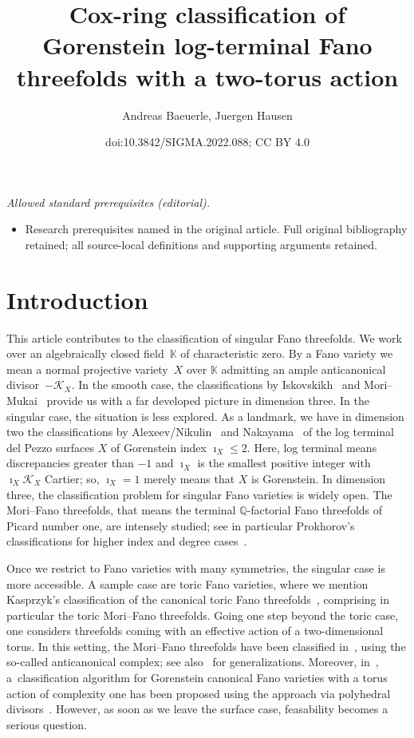 \documentclass[10pt,a4paper]{amsart}
\title{Cox-ring classification of Gorenstein log-terminal Fano threefolds with a two-torus action}
\author{Andreas Baeuerle, Juergen Hausen}
\date{doi:10.3842/SIGMA.2022.088; CC BY 4.0}
\theoremstyle{definition}
\def\KK{{\mathbb K}}
\def\QQ{{\mathbb Q}}
\numberwithin{equation}{section}
\begin{document}
\maketitle
\noindent\textit{Allowed standard prerequisites (editorial).}\begin{itemize}
\item Research prerequisites named in the original article. Full original bibliography retained; all source-local definitions and supporting arguments retained.
\end{itemize}\medskip
\section{Introduction}

This article contributes to the classification
of singular Fano threefolds.
We work over an algebraically closed field~$\KK$
of characteristic zero.
By a Fano variety we mean a normal projective
variety~$X$ over $\KK$ admitting an ample
anticanonical divisor~$-\mathcal{K}_X$.
In the smooth case, the classifications by
Iskovskikh~\cite{Is1,Is2} and Mori--Mukai~\cite{MoMu}
provide us with a far developed picture in dimension
three.
In the singular case, the situation is less explored.
As a landmark, we have in dimension two the
classifications by Alexeev/Nikulin~\cite{AlNi}
and Nakayama~\cite{Nak} of the log terminal del Pezzo
surfaces $X$ of Gorenstein index $\imath_X \le 2$.
Here, log terminal means discrepancies greater
than $-1$ and $\imath_X$ is the smallest positive
integer with $\imath_X\mathcal{K}_X$ Cartier;
so, $\imath_X=1$ merely means that $X$ is
Gorenstein.
In dimension three, the classification problem for
singular Fano varieties is widely open.
The Mori--Fano threefolds, that means the terminal
$\QQ$-factorial Fano threefolds of Picard number one,
are intensely studied; see in particular Prokhorov's
classifications for higher index and degree
cases~\cite{Pr1,Pr2,Pr3,Pr4}.

Once we restrict to Fano varieties with many symmetries,
the singular case is more accessible.
A sample case are toric Fano varieties, where we mention
Kasprzyk's classification of the canonical toric Fano
threefolds~\cite{Ka}, comprising in particular
the toric Mori--Fano threefolds.
Going one step beyond the toric case, one
considers threefolds coming with an effective action
of a two-dimensional torus.
In this setting, the Mori--Fano threefolds have
been classified in~\cite{BeHaHuNi},
using the so-called anticanonical complex; see
also~\cite{HiWr} for generalizations.
Moreover, in~\cite{Il}, a~classification algorithm
for Gorenstein canonical Fano varieties with a torus
action of complexity one has been proposed using
the approach via polyhedral divisors~\cite{AlHa}.
However, as soon as we leave the surface case,
feasability becomes a serious question.
\end{document}

